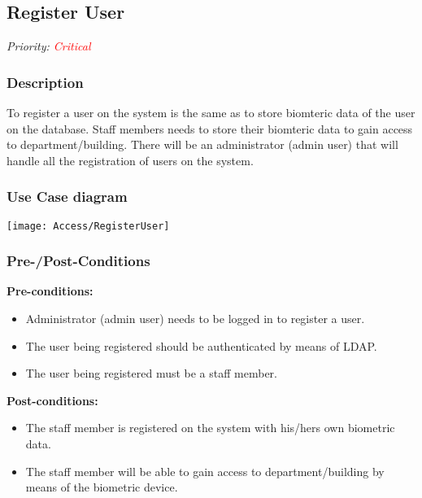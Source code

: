\subsection{Register User}
\textit{Priority: \textcolor{red}{Critical}} 

\subsubsection{Description}
To register a user on the system is the same as to store biomteric data of the user on the database.
Staff members needs to store their biomteric data to gain access to department/building. There will be an administrator (admin user) that will handle all the registration of users on the system.

\subsubsection{Use Case diagram}
\texttt{[image: Access/RegisterUser]}

\subsubsection{Pre-/Post-Conditions}
\textbf{Pre-conditions:} 
	\begin{itemize}
		\item Administrator (admin user) needs to be logged in to register a user.
		\item The user being registered should be authenticated by means of LDAP. 
		\item The user being registered must be a staff member.
	\end{itemize}
\textbf{ Post-conditions:} 
	\begin{itemize}
		\item The staff member is registered on the system with his/hers own biometric data.
		\item The staff member will be able to gain access to department/building by means of the biometric device.
	\end{itemize}